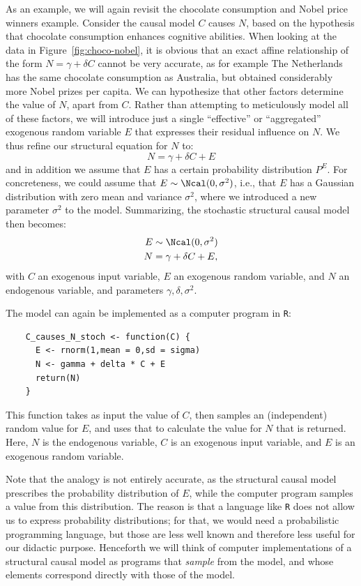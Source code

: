 As an example, we will again revisit the chocolate consumption and Nobel price
winners example. Consider the causal model $C$ causes $N$, based on the hypothesis
that chocolate consumption enhances cognitive abilities. When looking at the data
in Figure~\ref{fig:choco-nobel}, it is obvious that an exact affine relationship
of the form $N = \gamma + \delta C$ cannot be very accurate, as for example
The Netherlands has the same chocolate consumption as Australia, but obtained 
considerably more Nobel prizes per capita. We can hypothesize that 
other factors determine the value of $N$, apart from $C$. Rather than attempting to meticulously
model all of these factors, we will introduce just a single ``effective'' or 
``aggregated'' exogenous random
variable $E$ that expresses their residual influence on $N$. We thus refine our
structural equation for $N$ to:
  \begin{equation}\label{eq:se_C_causes_N_noisy}
  N = \gamma + \delta C + E
  \end{equation}
and in addition we assume that $E$ has a certain probability distribution $P^E$.
For concreteness, we could assume that $E \sim \Ncal(0,\sigma^2)$, i.e., that $E$
has a Gaussian distribution with zero mean and variance $\sigma^2$, where we 
introduced a new parameter $\sigma^2$ to the model. Summarizing, the stochastic
structural causal model then becomes:
  \begin{align*}\label{eq:scm_C_causes_N_noisy}
      E \sim {} & \Ncal(0,\sigma^2) \\
      N = {} & \gamma + \delta C + E,
  \end{align*}
with $C$ an exogenous input variable, $E$ an exogenous random variable,
and $N$ an endogenous variable, and parameters $\gamma,\delta,\sigma^2$.

The model can again be implemented as a computer program in \texttt{R}:
    \begin{lstlisting}
    C_causes_N_stoch <- function(C) {
      E <- rnorm(1,mean = 0,sd = sigma)
      N <- gamma + delta * C + E
      return(N)
    }
    \end{lstlisting}
This function takes as input the value of $C$, then samples an (independent) random 
value for $E$, and uses that to calculate the value for $N$ that is returned.
Here, $N$ is the endogenous variable, $C$ is an exogenous input variable, and $E$ is an exogenous random variable.

Note that the analogy is not entirely accurate, as the structural causal model
prescribes the probability distribution of $E$, while the computer program samples 
a value from this distribution. The reason is that a language like \texttt{R} does
not allow us to express probability distributions; for that, we would need a 
probabilistic programming language, but those are less well known and therefore less
useful for our didactic purpose. Henceforth we will think of computer implementations
of a structural causal model as programs that \emph{sample} from the model, and 
whose elements correspond directly with those of the model.
